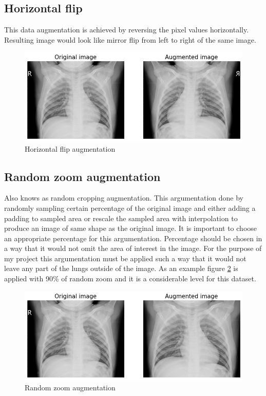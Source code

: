 \subsection{Horizontal flip}
This data augmentation is achieved by reversing the pixel values horizontally.
Resulting image would look like mirror flip from left to right of the same image.

\begin{figure}[H]
    \centering
    \includegraphics[width=\textwidth]{img/augmented-image-1588951788.png}
    \caption{Horizontal flip augmentation}
    \label{fig:horizontalflipxray}
\end{figure}

\subsection{Random zoom augmentation}
Also knows as random cropping augmentation.
This argumentation done by randomly sampling certain percentage of the original image and either adding a padding to sampled area or rescale the sampled area with interpolation to produce an image of same shape as the original image.
It is important to choose an appropriate percentage for this argumentation.
Percentage should be chosen in a way that it would not omit the area of interest in the image.
For the purpose of my project this argumentation must be applied such a way that it would not leave any part of the lungs outside of the image. 
As an example figure \ref{fig:randomzoomxray} is applied with 90\% of random zoom and it is a considerable level for this dataset.

\begin{figure}[H]
    \centering
    \includegraphics[width=\textwidth]{img/augmented-image-1588951794.png}
    \caption{Random zoom augmentation}
    \label{fig:randomzoomxray}
\end{figure}

